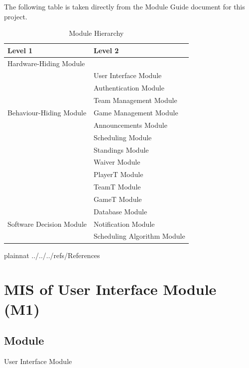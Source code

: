 \documentclass[12pt, titlepage]{article}
\begin{document}
The following table is taken directly from the Module Guide document for this project.

\begin{table}[h!]
  \centering
  \begin{tabular}{p{} p{}}
  \toprule
  \textbf{Level 1} & \textbf{Level 2}\\
  \midrule
  
  {Hardware-Hiding Module} & ~ \\
  \midrule
  
  \multirow{7}{0.3\textwidth}{Behaviour-Hiding Module} & User Interface Module\\
  & Authentication Module\\
  & Team Management Module\\
  & Game Management Module\\
  & Announcements Module\\
  & Scheduling Module\\
  & Standings Module\\
  & Waiver Module\\
  & PlayerT Module\\
  & TeamT Module\\
  & GameT Module\\
  \midrule
  
  \multirow{3}{0.3\textwidth}{Software Decision Module} & {Database Module}\\
  & {Notification Module}\\
  & {Scheduling Algorithm Module}\\
  \bottomrule
  
  \end{tabular}
  \caption{Module Hierarchy}
  \label{TblMH}
  \end{table}

\newpage

 {plainnat}
 {../../../refs/References}

\newpage

\section{MIS of User Interface Module (M1)} \label{Module:UI}

\subsection{Module}

User Interface Module
\end{document}
